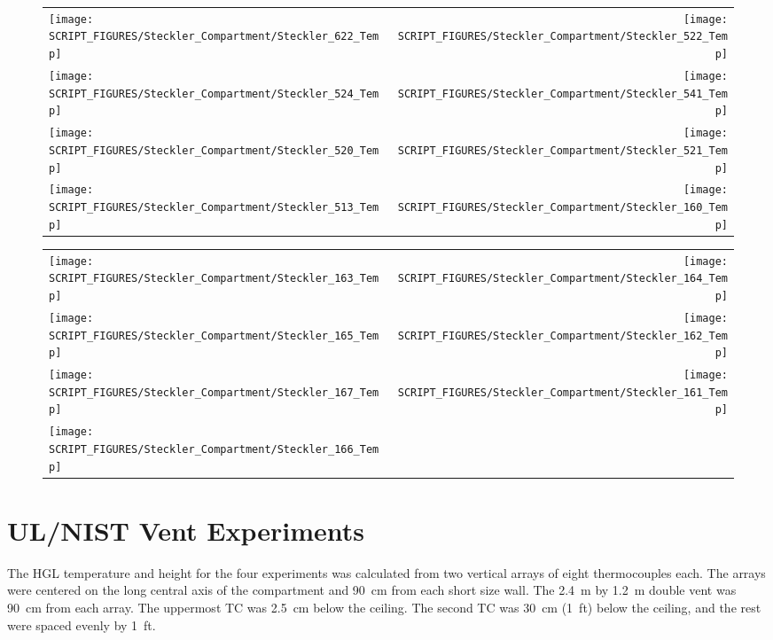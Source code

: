 \begin{figure}[p]
\begin{tabular*}{\textwidth}{l@{\extracolsep{\fill}}r}
\texttt{[image: SCRIPT\_FIGURES/Steckler\_Compartment/Steckler\_622\_Temp]} &
\texttt{[image: SCRIPT\_FIGURES/Steckler\_Compartment/Steckler\_522\_Temp]} \\
\texttt{[image: SCRIPT\_FIGURES/Steckler\_Compartment/Steckler\_524\_Temp]} &
\texttt{[image: SCRIPT\_FIGURES/Steckler\_Compartment/Steckler\_541\_Temp]} \\
\texttt{[image: SCRIPT\_FIGURES/Steckler\_Compartment/Steckler\_520\_Temp]} &
\texttt{[image: SCRIPT\_FIGURES/Steckler\_Compartment/Steckler\_521\_Temp]} \\
\texttt{[image: SCRIPT\_FIGURES/Steckler\_Compartment/Steckler\_513\_Temp]} &
\texttt{[image: SCRIPT\_FIGURES/Steckler\_Compartment/Steckler\_160\_Temp]}
\end{tabular*}
\label{Steckler_Temp_6}
\end{figure}

\begin{figure}[p]
\begin{tabular*}{\textwidth}{l@{\extracolsep{\fill}}r}
\texttt{[image: SCRIPT\_FIGURES/Steckler\_Compartment/Steckler\_163\_Temp]} &
\texttt{[image: SCRIPT\_FIGURES/Steckler\_Compartment/Steckler\_164\_Temp]} \\
\texttt{[image: SCRIPT\_FIGURES/Steckler\_Compartment/Steckler\_165\_Temp]} &
\texttt{[image: SCRIPT\_FIGURES/Steckler\_Compartment/Steckler\_162\_Temp]} \\
\texttt{[image: SCRIPT\_FIGURES/Steckler\_Compartment/Steckler\_167\_Temp]} &
\texttt{[image: SCRIPT\_FIGURES/Steckler\_Compartment/Steckler\_161\_Temp]} \\
\texttt{[image: SCRIPT\_FIGURES/Steckler\_Compartment/Steckler\_166\_Temp]} &
\end{tabular*}
\label{Steckler_Temp_7}
\end{figure}


\clearpage


\section{UL/NIST Vent Experiments}

The HGL temperature and height for the four experiments was calculated from two vertical arrays of eight thermocouples each. The arrays were centered on the long central axis of the compartment and 90~cm from each short size wall. The 2.4~m by 1.2~m double vent was 90~cm from each array. The uppermost TC was 2.5~cm below the ceiling. The second TC was 30~cm (1~ft) below the ceiling, and the rest were spaced evenly by 1~ft.

